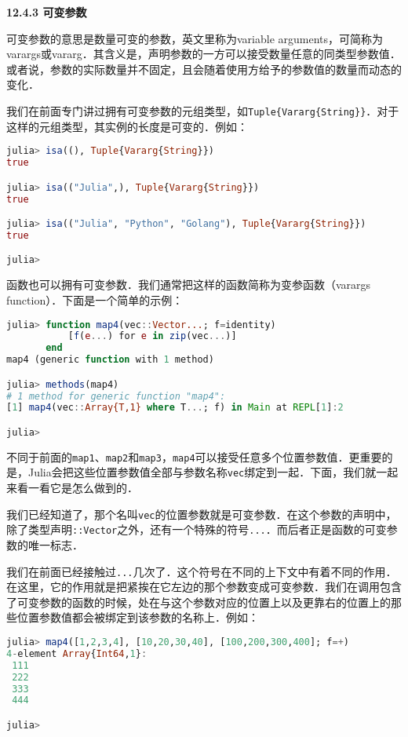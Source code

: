 \textbf{12.4.3 可变参数}

可变参数的意思是数量可变的参数，英文里称为variable arguments，可简称为varargs或vararg．其含义是，声明参数的一方可以接受数量任意的同类型参数值．或者说，参数的实际数量并不固定，且会随着使用方给予的参数值的数量而动态的变化．

我们在前面专门讲过拥有可变参数的元组类型，如\verb|Tuple{Vararg{String}}|．对于这样的元组类型，其实例的长度是可变的．例如：

\begin{lstlisting}[language=julia]
julia> isa((), Tuple{Vararg{String}})
true

julia> isa(("Julia",), Tuple{Vararg{String}})
true

julia> isa(("Julia", "Python", "Golang"), Tuple{Vararg{String}})
true

julia> 
\end{lstlisting}

函数也可以拥有可变参数．我们通常把这样的函数简称为变参函数（varargs function）．下面是一个简单的示例：

\begin{lstlisting}[language=julia]
julia> function map4(vec::Vector...; f=identity)
           [f(e...) for e in zip(vec...)]
       end
map4 (generic function with 1 method)

julia> methods(map4)
# 1 method for generic function "map4":
[1] map4(vec::Array{T,1} where T...; f) in Main at REPL[1]:2

julia>  
\end{lstlisting}

不同于前面的\verb|map1|、\verb|map2|和\verb|map3|，\verb|map4|可以接受任意多个位置参数值．更重要的是，Julia会把这些位置参数值全部与参数名称\verb|vec|绑定到一起．下面，我们就一起来看一看它是怎么做到的．

我们已经知道了，那个名叫\verb|vec|的位置参数就是可变参数．在这个参数的声明中，除了类型声明\verb|::Vector|之外，还有一个特殊的符号\verb|...|．而后者正是函数的可变参数的唯一标志．

我们在前面已经接触过\verb|...|几次了．这个符号在不同的上下文中有着不同的作用．在这里，它的作用就是把紧挨在它左边的那个参数变成可变参数．我们在调用包含了可变参数的函数的时候，处在与这个参数对应的位置上以及更靠右的位置上的那些位置参数值都会被绑定到该参数的名称上．例如：

\begin{lstlisting}[language=julia]
julia> map4([1,2,3,4], [10,20,30,40], [100,200,300,400]; f=+)
4-element Array{Int64,1}:
 111
 222
 333
 444

julia> 
\end{lstlisting}

